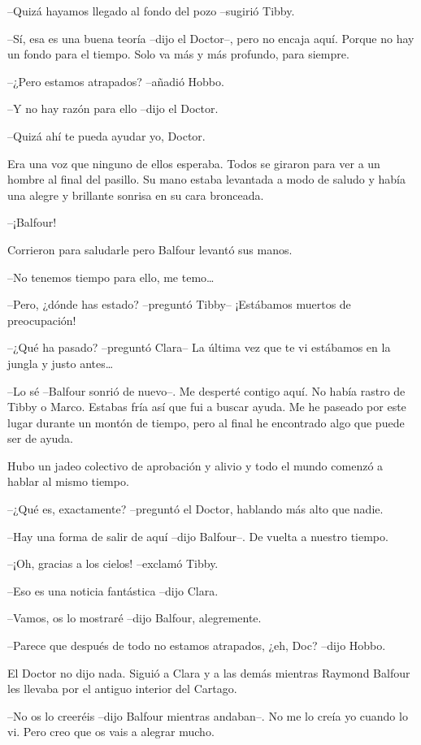 {--Quizá hayamos llegado al fondo del pozo --sugirió Tibby.}

{--Sí, esa es una buena teoría --dijo el Doctor--, pero no encaja aquí.
 Porque no hay un fondo para el tiempo. Solo va más y más profundo, para
siempre.}

{--¿Pero estamos atrapados? --añadió Hobbo.}

{--Y no hay razón para ello --dijo el Doctor.}

{--Quizá ahí te pueda ayudar yo, Doctor.}

{Era una voz que ninguno de ellos esperaba. Todos se giraron para ver a
 un hombre al final del pasillo. Su mano estaba levantada a modo de
saludo y había una alegre y brillante sonrisa en su cara bronceada.}

{--¡Balfour!}

{Corrieron para saludarle pero Balfour levantó sus manos.}

{--No tenemos tiempo para ello, me temo\ldots{}}

{--Pero, ¿dónde has estado? --preguntó Tibby-- ¡Estábamos muertos de
preocupación!}

{--¿Qué ha pasado? --preguntó Clara-- La última vez que te vi estábamos
 en la jungla y justo antes\ldots{}}

{--Lo sé --Balfour sonrió de nuevo--. Me desperté contigo aquí. No había
 rastro de Tibby o Marco. Estabas fría así que fui a buscar ayuda. Me he
 paseado por este lugar durante un montón de tiempo, pero al final he
encontrado algo que puede ser de ayuda.}

{Hubo un jadeo colectivo de aprobación y alivio y todo el mundo comenzó a
hablar al mismo tiempo.}

{--¿Qué es, exactamente? --preguntó el Doctor, hablando más alto que
nadie.}

{--Hay una forma de salir de aquí --dijo Balfour--. De vuelta a nuestro
tiempo.}

{--¡Oh, gracias a los cielos! --exclamó Tibby.}

{--Eso es una noticia fantástica --dijo Clara.}

{--Vamos, os lo mostraré --dijo Balfour, alegremente.}

{--Parece que después de todo no estamos atrapados, ¿eh, Doc? --dijo
Hobbo.}

{El Doctor no dijo nada. Siguió a Clara y a las demás mientras Raymond
Balfour les llevaba por el antiguo interior del Cartago.}

{--No os lo creeréis --dijo Balfour mientras andaban--. No me lo creía yo
cuando lo vi. Pero creo que os vais a alegrar mucho.}

